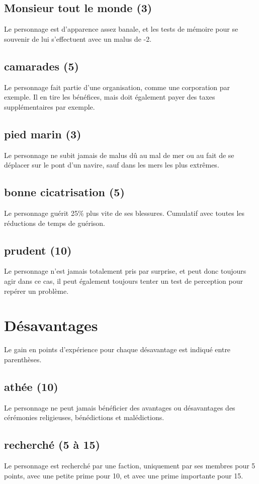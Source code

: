 \documentclass[10pt,a4paper,twocolumn]{book}
\begin{document}
\subsection*{Monsieur tout le monde (3) }
Le personnage est d'apparence assez banale, et les tests de mémoire pour se souvenir de lui s'effectuent avec un malus de -2.
\subsection*{camarades (5) }
Le personnage fait partie d'une organisation, comme une corporation par exemple. Il en tire les bénéfices, mais doit également payer des taxes supplémentaires par exemple.
\subsection*{pied marin (3) }
Le personnage ne subit jamais de malus dû au mal de mer ou au fait de se déplacer sur le pont d'un navire, sauf dans les mers les plus extrêmes.
\subsection*{bonne cicatrisation (5) }
Le personnage guérit 25\% plus vite de ses blessures. Cumulatif avec toutes les réductions de temps de guérison.
\subsection*{prudent (10) }
Le personnage n'est jamais totalement pris par surprise, et peut donc toujours agir dans ce cas, il peut également toujours tenter un test de perception pour repérer un problème.
\section{Désavantages}
Le gain en points d’expérience pour chaque désavantage est indiqué entre parenthèses.
\subsection*{athée (10) }
Le personnage ne peut jamais bénéficier des avantages ou désavantages des cérémonies religieuses, bénédictions et malédictions.
\subsection*{recherché (5 à 15) }
Le personnage est recherché par une faction, uniquement par ses membres pour 5 points, avec une petite prime pour 10, et avec une prime importante pour 15.
\end{document}

